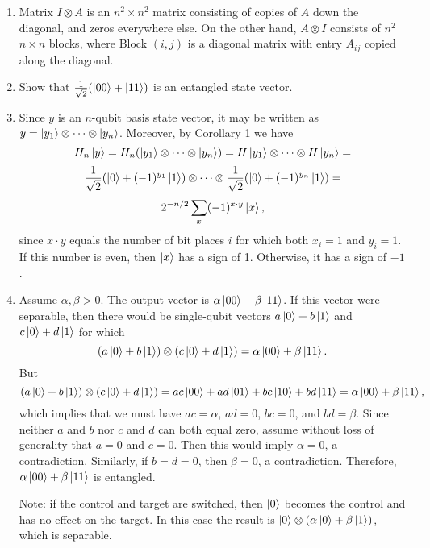 \documentclass [12pt]{article}
\theoremstyle{definition}
\begin{document}
\begin{enumerate}
\item Matrix $I\otimes A$ is an $n^2\times n^2$ matrix consisting of copies of $A$ down the diagonal, and zeros everywhere else.
On the other hand, $A\otimes I$ consists of $n^2$ $n\times n$ blocks, where Block $(i,j)$ is a diagonal matrix with entry $A_{ij}$ copied along the diagonal.

 

\item Show that $\frac{1}{\sqrt{2}}(\ket{00} + \ket{11})$ is an entangled state vector. 


\item Since $y$ is an $n$-qubit basis state vector, it may be written as $y=\ket{y_1}\otimes \cdots \otimes \ket{y_n}$.
Moreover, by Corollary 1 we have 
\[H_n\ket{y} = H_n(\ket{y_1}\otimes \cdots \otimes \ket{y_n})= H\ket{y_1}\otimes \cdots \otimes H\ket{y_n} = \]
\[\frac{1}{\sqrt{2}}(\ket{0}+(-1)^{y_1}\ket{1})\otimes \cdots \otimes \frac{1}{\sqrt{2}}(\ket{0}+(-1)^{y_n}\ket{1}) = \]
\[2^{-n/2}\sum_x(-1)^{x\cdot y}\ket{x},\] 
since $x\cdot y$ equals the number of bit places $i$ for which both $x_i=1$ and $y_i=1$. If this number is even, then $\ket{x}$ has a sign of 1.
Otherwise, it has a sign of $-1$. 


\item Assume $\alpha,\beta > 0$. The output vector is $\alpha\ket{00}+\beta\ket{11}$. If this vector were separable, then there would be single-qubit vectors 
$a\ket{0}+b\ket{1}$ and $c\ket{0}+d\ket{1}$ for which 
\[(a\ket{0}+b\ket{1})\otimes (c\ket{0}+d\ket{1}) = \alpha\ket{00}+\beta\ket{11}.\]
But 
\[(a\ket{0}+b\ket{1})\otimes (c\ket{0}+d\ket{1}) = ac\ket{00} + ad\ket{01} + bc\ket{10} + bd\ket{11}  = \alpha\ket{00}+\beta\ket{11},\]
which implies that we must have $ac = \alpha$, $ad=0$, $bc=0$, and $bd=\beta$. Since neither $a$ and $b$ nor $c$ and $d$ can both equal zero, assume without loss of generality
that $a=0$ and $c=0$. Then this would imply $\alpha=0$, a contradiction. Similarly, if $b=d=0$, then $\beta=0$, a contradiction.
Therefore, $\alpha\ket{00}+\beta\ket{11}$ is entangled.

Note: if the control and target are switched, then $\ket{0}$ becomes the control and has no effect on the target. In this case the result is
$\ket{0}\otimes (\alpha\ket{0}+\beta\ket{1})$, which is separable.




\end{enumerate}
\end{document}
